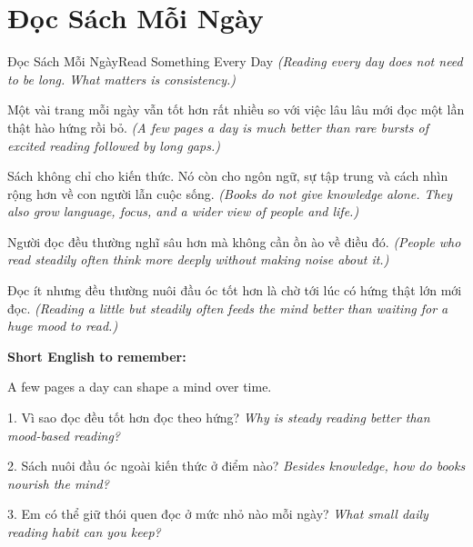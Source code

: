 \section{Đọc Sách Mỗi Ngày}
\begin{truyen}{Đọc Sách Mỗi Ngày}{Read Something Every Day}
\textit{(Reading every day does not need to be long. What matters is consistency.)}

Một vài trang mỗi ngày vẫn tốt hơn rất nhiều so với việc lâu lâu mới đọc một lần thật hào hứng rồi bỏ.
\textit{(A few pages a day is much better than rare bursts of excited reading followed by long gaps.)}

Sách không chỉ cho kiến thức. Nó còn cho ngôn ngữ, sự tập trung và cách nhìn rộng hơn về con người lẫn cuộc sống.
\textit{(Books do not give knowledge alone. They also grow language, focus, and a wider view of people and life.)}

Người đọc đều thường nghĩ sâu hơn mà không cần ồn ào về điều đó.
\textit{(People who read steadily often think more deeply without making noise about it.)}
\end{truyen}

\begin{baihoc}
Đọc ít nhưng đều thường nuôi đầu óc tốt hơn là chờ tới lúc có hứng thật lớn mới đọc.
\textit{(Reading a little but steadily often feeds the mind better than waiting for a huge mood to read.)}
\end{baihoc}

\begin{ghinhoanh}
\textbf{Short English to remember:}

A few pages a day can shape a mind over time.

\end{ghinhoanh}

\begin{tuhocnhanh}
1. Vì sao đọc đều tốt hơn đọc theo hứng? \textit{Why is steady reading better than mood-based reading?}

2. Sách nuôi đầu óc ngoài kiến thức ở điểm nào? \textit{Besides knowledge, how do books nourish the mind?}

3. Em có thể giữ thói quen đọc ở mức nhỏ nào mỗi ngày? \textit{What small daily reading habit can you keep?}
\end{tuhocnhanh}
\ngancach

